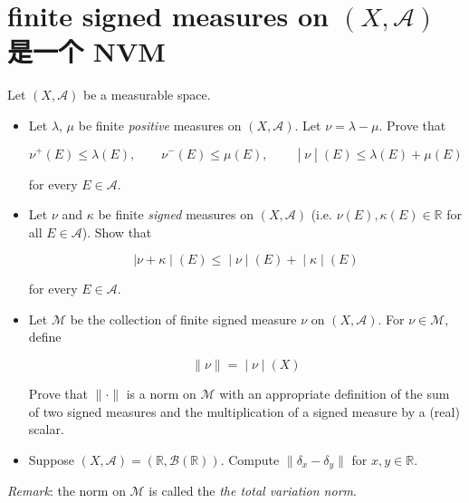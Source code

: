 \documentclass{qlnotes-export}
\begin{document}
\section{\texorpdfstring{finite signed measures on \((X,\mathcal{A})\) 是一个 NVM}{finite signed measures on (X,\textbackslash mathcal\{A\}) 是一个 NVM}}\label{finite-signed-measures-on-xmathcala-ux662fux4e00ux4e2a-nvm}

Let \((X,\mathcal{A})\) be a measurable space.

\begin{itemize}
\item
  Let \(\lambda\), \(\mu\) be finite \emph{positive} measures on \((X,\mathcal{A})\). Let \(\nu = \lambda - \mu\). Prove that

  \[\left. \nu^{+}(E) \leq \lambda(E),\qquad\nu^{-}(E) \leq \mu(E),\qquad \middle| \nu \middle| (E) \leq \lambda(E) + \mu(E) \right.\]

  for every \(E \in \mathcal{A}\).
\item
  Let \(\nu\) and \(\kappa\) be finite \emph{signed} measures on \((X,\mathcal{A})\) (i.e. \(\nu(E),\kappa(E) \in {\mathbb{R}}\) for all \(E \in \mathcal{A}\)). Show that

  \[\left. |\nu + \kappa \middle| (E) \leq \middle| \nu \middle| (E) + \middle| \kappa \middle| (E) \right.\]

  for every \(E \in \mathcal{A}\).
\item
  Let \(\mathcal{M}\) be the collection of finite signed measure \(\nu\) on \((X,\mathcal{A})\). For \(\nu \in \mathcal{M}\), define

  \[\left. \parallel \nu \parallel = \middle| \nu \middle| (X) \right.\]

  Prove that \(\parallel \cdot \parallel\) is a norm on \(\mathcal{M}\) with an appropriate definition of the sum of two signed measures and the multiplication of a signed measure by a (real) scalar.
\item
  Suppose \((X,\mathcal{A}) = ({\mathbb{R}},\mathcal{B}({\mathbb{R}}))\). Compute \(\parallel \delta_{x} - \delta_{y} \parallel\) for \(x,y \in {\mathbb{R}}\).
\end{itemize}

\emph{Remark}: the norm on \(\mathcal{M}\) is called the \emph{the total variation norm}.
\end{document}
